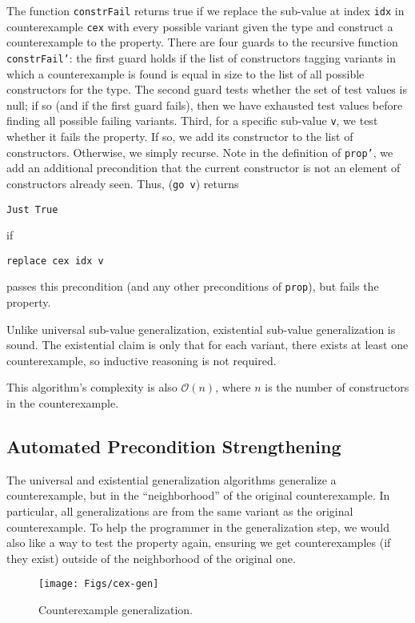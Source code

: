 \documentclass{sigplanconf}
\newenvironment{code}{\begin{alltt}\footnotesize}{\end{alltt}}
\newcommand{\ttp}[1]{\texttt{#1}}
\begin{document}
The function \ttp{constrFail} returns true if we replace the sub-value at index
\ttp{idx} in counterexample \ttp{cex} with every possible variant given the type
and construct a counterexample to the property.  There are four guards to the
recursive function \ttp{constrFail'}: the first guard holds if the list of
constructors tagging variants in which a counterexample is found is equal in
size to the list of all possible constructors for the type.  The second guard
tests whether the set of test values is null; if so (and if the first guard
fails), then we have exhausted test values before finding all possible failing
variants.  Third, for a specific sub-value \ttp{v}, we test whether it fails the
property.  If so, we add its constructor to the list of constructors.
Otherwise, we simply recurse.  Note in the definition of \ttp{prop'}, we add an
additional precondition that the current constructor is not an element of
constructors already seen.  Thus, (\ttp{go v}) returns
%
\begin{code}
\ttp{Just True}
\end{code}
%
\noindent
if
%
\begin{code}
\ttp{replace cex idx v}
\end{code}
%
passes this precondition (and any other preconditions of \ttp{prop}), but fails
the property.

Unlike universal sub-value generalization, existential sub-value generalization
is sound.  The existential claim is only that for each variant, there exists at
least one counterexample, so inductive reasoning is not required.

This algorithm's complexity is also $\mathcal{O}(n)$, where $n$ is the number of
constructors in the counterexample.

\subsection{Automated Precondition Strengthening}\label{sec:precondition}
The universal and existential generalization algorithms generalize a
counterexample, but in the ``neighborhood'' of the original counterexample.  In
particular, all generalizations are from the same variant as the original
counterexample.  To help the programmer in the generalization step, we would
also like a way to test the property again, ensuring we get counterexamples (if
they exist) outside of the neighborhood of the original one.

\begin{figure}[ht!]
  \begin{center}
    \texttt{[image: Figs/cex-gen]}
   \end{center}
  \caption{Counterexample generalization.}
  \label{fig:cex-gen}
\end{figure}
\end{document}
